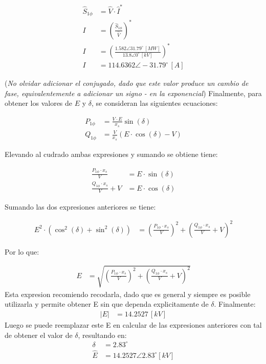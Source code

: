 \documentclass[
  11pt,
  letterpaper,
   addpoints,
   answers
  ]{exam}
\begin{document}
\begin{questions}
\begin{solution}
\begin{align}
\hat{S}_{1\phi} &= \hat{V} \cdot \hat{I}^* \\
I &= \left( \frac{\hat{S}_{1\phi}}{\hat{V}} \right)^* \\
I &= \left( \frac{1.582 \angle 31.79^\circ \, [MW]}{13.8 \angle 0^\circ \, [kV]} \right)^* \\
I &= 114.6362 \angle -31.79^\circ \, [A]
\end{align}

(\textit{No olvidar adicionar el conjugado, dado que este valor produce un cambio de fase, equivalentemente a adicionar un signo - en la exponencial}) Finalmente, para obtener los valores de \(E\) y \(\delta\), se consideran las siguientes ecuaciones:

\begin{align}
P_{1\phi} &= \frac{V \cdot E}{x_s} \sin(\delta) \\
Q_{1\phi} &= \frac{V}{x_s} \left( E \cdot \cos(\delta) - V \right)
\end{align}

Elevando al cudrado ambas expresiones y sumando se obtiene tiene:

\begin{align}
\frac{P_{1\phi} \cdot x_s}{V} &= E \cdot \sin(\delta) \\
\frac{Q_{1\phi} \cdot x_s}{V} + V &= E \cdot \cos(\delta)
\end{align}

Sumando las dos expresiones anteriores se tiene:

\begin{align}
E^2 \cdot \left( \cos^2(\delta) + \sin^2(\delta) \right) &= \left( \frac{P_{1\phi} \cdot x_s}{V} \right)^2 + \left( \frac{Q_{1\phi} \cdot x_s}{V} + V \right)^2
\end{align}

Por lo que:

\begin{align}
E &= \sqrt{\left( \frac{P_{1\phi} \cdot x_s}{V} \right)^2 + \left( \frac{Q_{1\phi} \cdot x_s}{V} + V \right)^2}
\end{align}
Esta expresion recomiendo recodarla, dado que es general y siempre es posible utilizarla y permite obtener E sin que dependa explicitamente de \( \delta \). Finalmente:
\begin{align}
|E| &= 14.2527 \, [kV]
\end{align}
Luego se puede reemplazar este E en calcular de las expresiones anteriores con tal de obtener el valor de \( \delta \), resultando en:
\begin{align}
\delta &= 2.83^\circ \\
\hat{E} &= 14.2527 \angle 2.83^\circ [kV]
\end{align}

\end{solution}
\end{questions}
\end{document}
